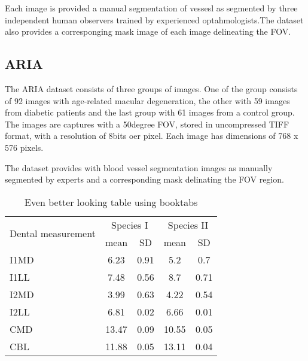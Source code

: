 Each image is provided a manual segmentation of vessesl as segmented by three independent human observers trained by experienced optahmologists.The dataset also provides a corresponging mask image of each image delineating the FOV.

\subsection{ARIA}
The ARIA dataset consists of three groups of images. One of the group consists of 92 images with age-related macular degeneration, the other with 59 images from diabetic patients and the last group with 61 images from a control group.
The images are captures with a 50degree FOV, stored in uncompressed TIFF format, with a resolution of 8bits oer pixel. Each image has dimensions of 768 x 576 pixels.

The dataset provides with blood vessel segmentation images as manually segmented by experts and a corresponding mask delinating the FOV region.



\begin{table}
\caption{Even better looking table using booktabs}
\centering
\label{table:good_table}
\begin{tabular}{l c c c c}
\toprule
\multirow{2}{*}{Dental measurement} & \multicolumn{2}{c}{Species I} & \multicolumn{2}{c}{Species II} \\ 
\cmidrule{2-5}
  & mean & SD  & mean & SD  \\ 
\midrule
I1MD & 6.23 & 0.91 & 5.2  & 0.7  \\

I1LL & 7.48 & 0.56 & 8.7  & 0.71 \\

I2MD & 3.99 & 0.63 & 4.22 & 0.54 \\

I2LL & 6.81 & 0.02 & 6.66 & 0.01 \\

CMD & 13.47 & 0.09 & 10.55 & 0.05 \\

CBL & 11.88 & 0.05 & 13.11 & 0.04\\ 
\bottomrule
\end{tabular}
\end{table}
